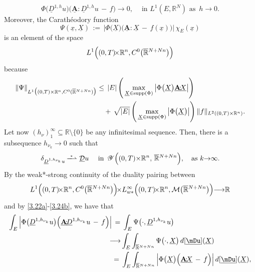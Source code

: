 \documentclass{amsart}
\theoremstyle{definition}
\numberwithin{equation}{section}
\begin{document}
\begin{equation} \label{3.22a}
\Phi\big({\underline{D}}^{1,h}u\big)\Big( {\underline{\textbf{A}}} {\!:\!} {\underline{D}}^{1,h}u \,-\, f \Big){\longrightarrow} 0, \ \ \ \ \text{ in }L^1 ( E,{\mathbb{R}}^N ) \text{ as }\, h{\rightarrow}0.
\end{equation}
Moreover, the Carath\'eodory  function
\begin{equation} \label{3.23a}
\Psi(\underline{x},\underline{X})\, :=\,  \Big|\Phi\big( \underline{X} \big)\Big( {\underline{\textbf{A}}} {\!:\!} \underline{X}\,-\, f(\underline{x}) \Big) \Big| \, \chi_{E}(\underline{x})
\end{equation}
is an element of the space
\[
L^1\Big((0,T)\!{\times} {\mathbb{R}}^n,C^0\big( \smash{\overline{\mathbb{R}}}^{N+Nn} \big)\Big)
\]
because
\[
\begin{split}
\|\Psi \|_{L^1 \big((0,T){\times} {\mathbb{R}}^n,C^0 ( \smash{\overline{\mathbb{R}}}^{N+Nn} )\big)} 
&\leq\, 
|E|\, \Bigg(\max_{\underline{X} \in {\textrm{supp}}(\Phi)}\big| \Phi\big( \underline{X} \big)  {\underline{\textbf{A}}} {\!:\!} \underline{X} \big|\Bigg)\\
&\ \ \ +\, \sqrt{|E|}\, \Bigg(\max_{\underline{X} \in {\textrm{supp}}(\Phi)}\big| \Phi\big( \underline{X}\big) \big|\Bigg)\, \|f\|_{L^2((0,T){\times} {\mathbb{R}}^n)}.
\end{split}
\]
Let now $(h_\nu)_1^\infty {\subseteq} {\mathbb{R}}{\setminus}\{0\}$ be any infinitesimal sequence. Then, there is a subsequence $h_{\nu_k}{\rightarrow} 0$ such that
\begin{equation} \label{3.24b}
{\delta}_{{\underline{D}}^{1,h_{\nu_k}}u} \, \overset{^*}{\smash{-\!\!\!\!-\!\!\!\!\rightharpoonup}}\,\, \underline{\mathcal{D}} u\ \ \ \text{ in }\, {\mathscr{Y}}\Big((0,T){\times} {\mathbb{R}}^n, \, \smash{\overline{\mathbb{R}}}^{N+Nn}\Big), \ \ \text{ as }k {\rightarrow} \infty.
\end{equation}
By the weak*-strong continuity of the duality pairing between 
\[
L^1\Big((0,T) \!{\times} {\mathbb{R}}^n,C^0\big( \smash{\overline{\mathbb{R}}}^{N+Nn} \big)\Big) \!{\times} L^\infty_{w*}\Big((0,T)\!{\times} {\mathbb{R}}^n,{\mathcal{M}}\big( \smash{\overline{\mathbb{R}}}^{N+Nn} \big)\Big) {\longrightarrow} {\mathbb{R}}
\]
and by \eqref{3.22a}-\eqref{3.24b}, we have that
\begin{equation} \label{3.25a}
\begin{split}
\int_E  \Big|\Phi\big( {\underline{D}}^{1,h_{\nu_k}}u\big)\Big( {\underline{\textbf{A}}} {\!:\!} {\underline{D}}^{1,h_{\nu_k}}u\,-\, f \Big) \Big|&\,=\, \int_E \Psi \big(\cdot,{\underline{D}}^{1,h_{\nu_k}}u\big)\\
&\!\!{\longrightarrow}  \int_E \int_{ \smash{\overline{\mathbb{R}}}^{N+Nn} } \Psi \big(\cdot, \underline{X} \big)\, d[\underline\mDu ]( \underline{X} ) \\
&=\, \int_E  \int_{ \smash{\overline{\mathbb{R}}}^{N+Nn} }  \Big|\Phi\big( \underline{X} \big)\Big( {\underline{\textbf{A}}} {\!:\!}  \underline{X}\,-\, f \Big) \Big|  \, d[\underline\mDu ]( \underline{X} ),
\end{split}
\end{equation}
\end{document}

